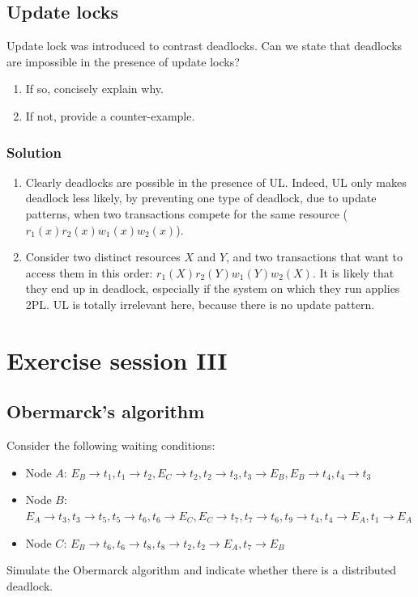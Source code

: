 \documentclass[12pt, a4paper]{report}
\newtheorem[style=M,bodystyle=\normalfont]{theorem}{Theorem}
\newtheorem[style=M,bodystyle=\normalfont]{corollary}{Corollary}
\newtheorem[style=M,bodystyle=\normalfont]{lemma}{Lemma}
\newtheorem[style=M,bodystyle=\normalfont]{definition}{Definition}
\begin{document}
    \newpage

    \section{Update locks}
        Update lock was introduced to contrast deadlocks. Can we state that deadlocks are impossible in the presence of update locks?
        \begin{enumerate}
            \item If so, concisely explain why. 
            \item If not, provide a counter-example.
        \end{enumerate}
    \subsection*{Solution}
        \begin{enumerate}
            \item Clearly deadlocks are possible in the presence of UL. Indeed, UL only makes deadlock less likely, by preventing one type of deadlock, due to 
                update patterns, when two transactions compete for the same resource ($r_1(x) r_2(x) w_1(x) w_2(x)$). 
            \item Consider two distinct resources $X$ and $Y$, and two transactions that want to access them in this order: $r_1(X) r_2(Y) w_1(Y) w_2(X)$. It is likely that they end up 
                in deadlock, especially if the system on which they run applies 2PL. UL is totally irrelevant here, because there is no update pattern. 
        \end{enumerate}

\newpage

\chapter{Exercise session III}
    \section{Obermarck's algorithm}
        Consider the following waiting conditions:
        \begin{itemize}
            \item Node $A$: $E_B \rightarrow t_1, t_1 \rightarrow t_2, E_C \rightarrow t_2, t_2 \rightarrow t_3, t_3 \rightarrow E_B, E_B \rightarrow t_4, t_4 \rightarrow t_3$
            \item Node $B$: $E_A \rightarrow t_3, t_3 \rightarrow t_5, t_5 \rightarrow t_6, t_6 \rightarrow E_C, E_C \rightarrow t_7, t_7 \rightarrow t_6, t_9 \rightarrow t_4,t_4 \rightarrow E_A, t_1 \rightarrow E_A$
            \item Node $C$: $E_B \rightarrow t_6, t_6 \rightarrow t_8, t_8 \rightarrow t_2, t_2 \rightarrow E_A, t_7 \rightarrow E_B$
        \end{itemize}
        Simulate the Obermarck algorithm and indicate whether there is a distributed deadlock.
\end{document}
